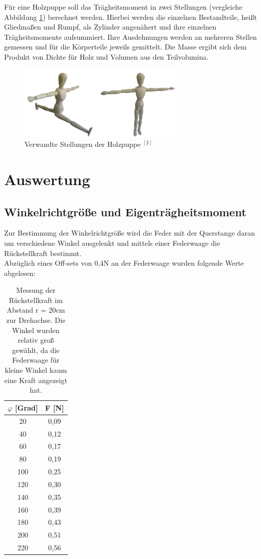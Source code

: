 Für eine Holzpuppe soll das Trägheitsmoment in zwei Stellungen (vergleiche Abbildung \ref{pic_puppe}) berechnet werden. Hierbei werden
die einzelnen Bestandteile, heißt Gliedmaßen und Rumpf, als Zylinder angenähert und ihre einzelnen Trägheitsmomente aufsummiert. Ihre 
Ausdehnungen werden an mehreren Stellen gemessen und für die Körperteile jeweils gemittelt. Die Masse ergibt sich dem Produkt von Dichte für Holz
und Volumen aus den Teilvolumina.

\begin{figure}[H]
\includegraphics[width=0.7\textwidth]{pics/puppe.png}
\caption{Verwandte Stellungen der Holzpuppe $^{[2]}$}
\label{pic_puppe}
\end{figure}

\section{Auswertung}
\subsection{Winkelrichtgröße und Eigenträgheitsmoment}
Zur Bestimmung der Winkelrichtgröße wird die Feder mit der Querstange daran um verschiedene Winkel ausgelenkt und mittels einer Federwaage die Rückstellkraft bestimmt.\\
Abzüglich eines Off-sets von 0,4N an der Federwaage wurden folgende Werte abgelesen:
\begin{table}[H]
\begin{tabular}{|c|c|}
\hline 
$\varphi$ [Grad]&	F [N]\\ \hline
20	&0,09\\ \hline
40	&0,12\\ \hline
60	&0,17\\ \hline
80	&0,19\\ \hline
100	&0,25\\ \hline
120	&0,30\\ \hline
140	&0,35\\ \hline
160	&0,39\\ \hline
180	&0,43\\ \hline
200	&0,51\\ \hline
220	&0,56\\ \hline
\end{tabular} 
\caption{Messung der Rückstellkraft im Abstand r = 20cm zur Drehachse. Die Winkel wurden relativ groß gewählt, da die Federwaage für kleine Winkel kaum eine Kraft angezeigt hat.}
\end{table}

